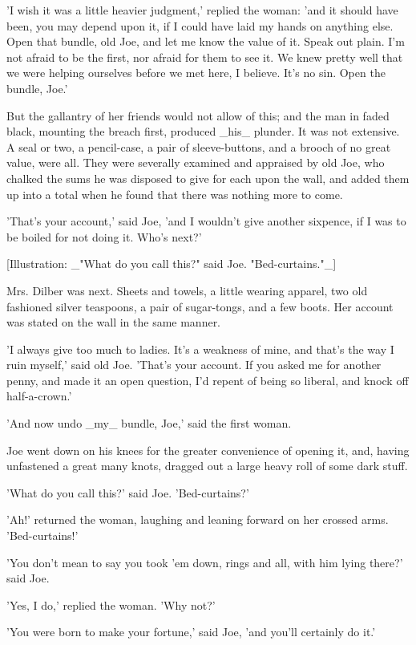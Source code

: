 'I wish it was a little heavier judgment,' replied the woman: 'and it
should have been, you may depend upon it, if I could have laid my hands
on anything else. Open that bundle, old Joe, and let me know the value
of it. Speak out plain. I'm not afraid to be the first, nor afraid for
them to see it. We knew pretty well that we were helping ourselves
before we met here, I believe. It's no sin. Open the bundle, Joe.'

But the gallantry of her friends would not allow of this; and the man in
faded black, mounting the breach first, produced _his_ plunder. It was
not extensive. A seal or two, a pencil-case, a pair of sleeve-buttons,
and a brooch of no great value, were all. They were severally examined
and appraised by old Joe, who chalked the sums he was disposed to give
for each upon the wall, and added them up into a total when he found
that there was nothing more to come.

'That's your account,' said Joe, 'and I wouldn't give another sixpence,
if I was to be boiled for not doing it. Who's next?'


[Illustration: _"What do you call this?" said Joe. "Bed-curtains."_]

Mrs. Dilber was next. Sheets and towels, a little wearing apparel, two
old fashioned silver teaspoons, a pair of sugar-tongs, and a few
boots. Her account was stated on the wall in the same manner.

'I always give too much to ladies. It's a weakness of mine, and that's
the way I ruin myself,' said old Joe. 'That's your account. If you asked
me for another penny, and made it an open question, I'd repent of being
so liberal, and knock off half-a-crown.'

'And now undo _my_ bundle, Joe,' said the first woman.

Joe went down on his knees for the greater convenience of opening it,
and, having unfastened a great many knots, dragged out a large heavy
roll of some dark stuff.

'What do you call this?' said Joe. 'Bed-curtains?'

'Ah!' returned the woman, laughing and leaning forward on her crossed
arms. 'Bed-curtains!'

'You don't mean to say you took 'em down, rings and all, with him lying
there?' said Joe.

'Yes, I do,' replied the woman. 'Why not?'

'You were born to make your fortune,' said Joe, 'and you'll certainly do
it.'

